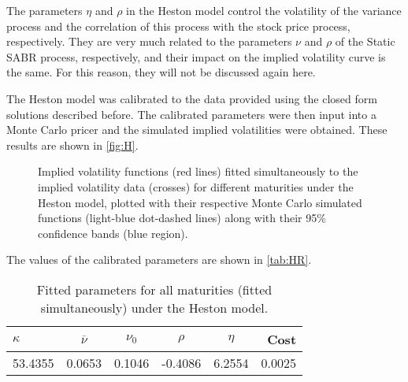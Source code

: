 The parameters $\eta$ and $\rho$ in the Heston model control the volatility of the variance process and the correlation of this process with the stock price process, respectively. They are very much related to the parameters $\nu$ and $\rho$ of the Static SABR process, respectively, and their impact on the implied volatility curve is the same. For this reason, they will not be discussed again here.


The Heston model was calibrated to the data provided using the closed form solutions described before. The calibrated parameters were then input into a Monte Carlo pricer and the simulated implied volatilities were obtained. These results are shown in \autoref{fig:H}.

\begin{figure}[H]
  \begin{subfigmatrix}{2}
  \end{subfigmatrix}
  \caption[Implied volatility functions fitted simultaneously to the implied volatility data for different maturities under the Heston model, plotted with their respective Monte Carlo simulated functions along with their 95\% confidence bands.]{Implied volatility functions (red lines) fitted simultaneously to the implied volatility data (crosses) for different maturities under the Heston model, plotted with their respective Monte Carlo simulated functions (light-blue dot-dashed lines) along with their 95\% confidence bands (blue region).}
  \label{fig:H}
\end{figure}

The values of the calibrated parameters are shown in \autoref{tab:HR}.

\begin{table}[H]
    \centering
        \renewcommand{\arraystretch}{0.8}
\begin{tabular}{@{}lccccr@{}}
\toprule
$\kappa$ & $\overline{\nu}$ & $\nu_0$ & $\rho$ & $\eta$ & Cost \\ \midrule
53.4355 & 0.0653 & 0.1046 & -0.4086 & 6.2554 & 0.0025 \\
\bottomrule
\end{tabular}
  \caption[Fitted parameters for all maturities (fitted simultaneously) under the Heston model.]{Fitted parameters for all maturities (fitted simultaneously) under the Heston model.}
  \label{tab:HR}
\end{table}



